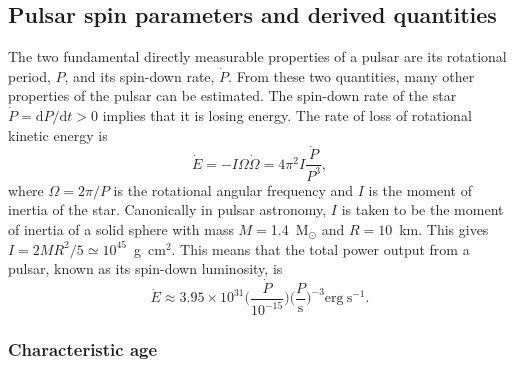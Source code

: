 \subsection{Pulsar spin parameters and derived quantities}
\label{sec: intro - general intro - spin parameters}

The two fundamental directly measurable properties of a pulsar are its rotational period, $P$, and its spin-down rate, $\dot{P}$. From these two quantities, many other properties of the pulsar can be estimated. The spin-down rate of the star $\dot{P} = \mathrm{d}P/\mathrm{d}t > 0$ implies that it is losing energy. The rate of loss of rotational kinetic energy is
\begin{equation}
    \label{eq: intro - Edot}
    \dot{E} = -I\Omega\dot{\Omega} = 4\pi^2I\frac{\dot{P}}{P^3},
\end{equation}
where $\Omega = 2\pi/P$ is the rotational angular frequency and $I$ is the moment of inertia of the star. Canonically in pulsar astronomy, $I$ is taken to be the moment of inertia of a solid sphere with mass $M=$1.4~M$_\odot$ and $R=10$~km. This gives $I=2MR^2/5\simeq 10^{45}$~g~cm$^2$. This means that the total power output from a pulsar, known as its spin-down luminosity, is
\begin{equation}
    \label{eq: intro - Edot canonical}
    \dot{E} \approx 3.95\times10^{31} \bigg(\frac{\dot{P}}{10^{-15}}\bigg) \bigg(\frac{P}{\mathrm{s}}\bigg)^{-3} \mathrm{erg\ s}^{-1}.
\end{equation}


\subsubsection{Characteristic age}
\label{sec: intro - general intro - spin parameters - characteristic age}

